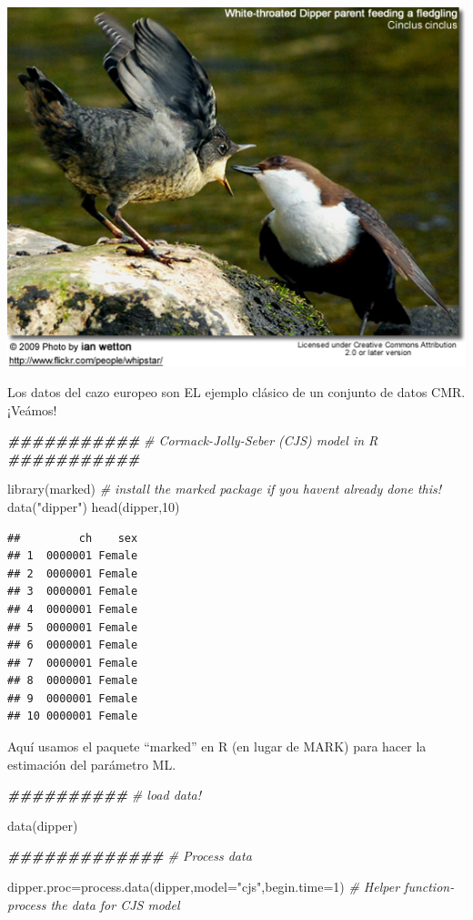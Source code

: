 \documentclass[
]{article}
\newenvironment{Shaded}{\begin{snugshade}}{\end{snugshade}}
\newcommand{\AttributeTok}[1]{\textcolor[rgb]{0.77,0.63,0.00}{#1}}
\newcommand{\CommentTok}[1]{\textcolor[rgb]{0.56,0.35,0.01}{\textit{#1}}}
\newcommand{\DecValTok}[1]{\textcolor[rgb]{0.00,0.00,0.81}{#1}}
\newcommand{\DocumentationTok}[1]{\textcolor[rgb]{0.56,0.35,0.01}{\textbf{\textit{#1}}}}
\newcommand{\FunctionTok}[1]{\textcolor[rgb]{0.00,0.00,0.00}{#1}}
\newcommand{\NormalTok}[1]{#1}
\newcommand{\OtherTok}[1]{\textcolor[rgb]{0.56,0.35,0.01}{#1}}
\newcommand{\StringTok}[1]{\textcolor[rgb]{0.31,0.60,0.02}{#1}}
\begin{document}
\includegraphics{figures/dipper1.png}

Los datos del cazo europeo son EL ejemplo clásico de un conjunto de
datos CMR. ¡Veámos!

\begin{Shaded}
\begin{Highlighting}[]
\DocumentationTok{\#\#\#\#\#\#\#\#\#\#\#}
\CommentTok{\# Cormack{-}Jolly{-}Seber (CJS) model in R}
\DocumentationTok{\#\#\#\#\#\#\#\#\#\#\#}

\FunctionTok{library}\NormalTok{(marked)      }\CommentTok{\# install the \textquotesingle{}marked\textquotesingle{} package if you haven\textquotesingle{}t already done this!}
\FunctionTok{data}\NormalTok{(}\StringTok{"dipper"}\NormalTok{)}
\FunctionTok{head}\NormalTok{(dipper,}\DecValTok{10}\NormalTok{)}
\end{Highlighting}
\end{Shaded}

\begin{verbatim}
##         ch    sex
## 1  0000001 Female
## 2  0000001 Female
## 3  0000001 Female
## 4  0000001 Female
## 5  0000001 Female
## 6  0000001 Female
## 7  0000001 Female
## 8  0000001 Female
## 9  0000001 Female
## 10 0000001 Female
\end{verbatim}

Aquí usamos el paquete ``marked'' en R (en lugar de MARK) para hacer la
estimación del parámetro ML.

\begin{Shaded}
\begin{Highlighting}[]
\DocumentationTok{\#\#\#\#\#\#\#\#\#\#}
\CommentTok{\# load data!}

\FunctionTok{data}\NormalTok{(dipper)}

\DocumentationTok{\#\#\#\#\#\#\#\#\#\#\#\#\#}
\CommentTok{\# Process data}

\NormalTok{dipper.proc}\OtherTok{=}\FunctionTok{process.data}\NormalTok{(dipper,}\AttributeTok{model=}\StringTok{"cjs"}\NormalTok{,}\AttributeTok{begin.time=}\DecValTok{1}\NormalTok{)  }\CommentTok{\# Helper function{-} process the data for CJS model}
\end{Highlighting}
\end{Shaded}
\end{document}
